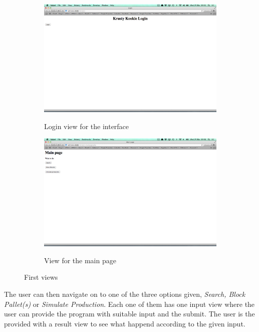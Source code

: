 \documentclass[a4paper]{scrartcl}
\numberwithin{equation}{section}
\begin{document}
\begin{figure}[h]
  \centering
  	\begin{subfigure}[b]{0.45\textwidth}
    	\includegraphics[width=\textwidth]{figures/view_login.png}
    	\label{figure:view_login}
    	\caption{Login view for the interface}
 		\end{subfigure}	

 		\begin{subfigure}[b]{0.45\textwidth}
    	\includegraphics[width=\textwidth]{figures/view_mainpage.png}
    	\label{figure:view_mainpage}
    	\caption{View for the main page}
 		\end{subfigure} 
 		\caption{First views}
\end{figure}

The user can then navigate on to one of the three options given, \emph{Search, Block Pallet(s)} or \emph{Simulate Production}. Each one of them has one input view where the user can provide the program with suitable input and the submit. The user is the provided with a result view to see what happend according to the given input.
\end{document}
